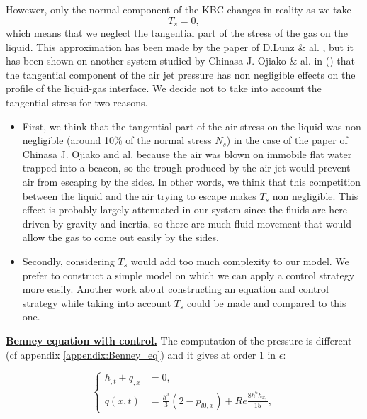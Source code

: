 \documentclass[12pt]{article}
\begin{document}
Howewer, only the normal component of the KBC changes in reality as we take  
\begin{equation}
    \boxed{
T_s=0,
    }
\end{equation} 
which means that we neglect the tangential part of the stress of the gas on the liquid.  This approximation has been made by the paper 
of D.Lunz \& al. \cite{Moving_pressure_source}, but it has been shown on another system studied by Chinasa J. Ojiako \& al. in
 (\cite{Dewetting_Ojiako}) that the tangential component of the air jet pressure has non negligible effects on the profile of the liquid-gas interface. 
 We decide not to take into account the tangential stress for two reasons.
\begin{itemize}
    \item First, we think that the tangential part of the air stress on the liquid was non negligible (around 10\% of the normal
     stress $N_s$) in the case of the paper of Chinasa J. Ojiako and al. because the air was blown on immobile flat water trapped into a beacon, so the trough 
     produced by the air jet would prevent air from escaping by the sides. In other words, we think that this competition between the liquid and the 
     air trying to escape makes $T_s$ non negligible. This effect is probably largely attenuated in our system 
     since the fluids are here driven by gravity and inertia, so there are much fluid movement that would allow the gas to come out 
     easily by the sides. 
    \item Secondly, considering $T_s$ would add too much complexity to our model. We prefer to construct a simple model on which
     we can apply a control strategy more easily. Another work about constructing an equation and control strategy while taking into account $T_s$ could be made and compared to this one.
\end{itemize}


\underline{\textbf{Benney equation with control.}}
The computation of the pressure is different (cf appendix \ref{appendix:Benney_eq}) and it gives at order 1 in $\epsilon$:

\begin{equation}\label{Benney_ctrl_flux}
\boxed{
    \left\{
\begin{aligned}
    h_{,t}+q_{,x} &= 0,\\
    q(x, t) &= \frac{h^3}{3}(2-p_{l0,x})+Re\frac{8h^6h_{x,}}{15},
\end{aligned}
\right.
}
\end{equation}
\end{document}
